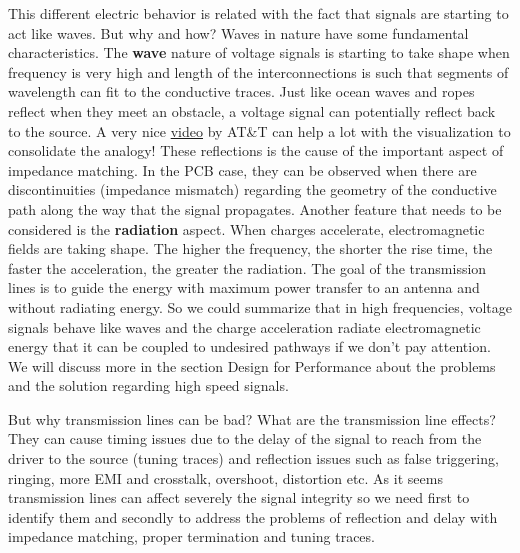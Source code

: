 \documentclass[final]{cubedoc}
\begin{document}
	
	
	This different electric behavior is related with the fact that signals are starting to act like waves. But why and how?
	Waves in nature have some fundamental characteristics. The \textbf{wave} nature of voltage signals is starting to take shape when frequency is very high and length of the interconnections is such that segments of wavelength can fit to the conductive traces. Just like ocean waves and ropes reflect when they meet an obstacle, a voltage signal can potentially reflect back to the source. A very nice \href{https://www.youtube.com/watch?v=DovunOxlY1k}{video} by AT\&T can help a lot with the visualization to consolidate the analogy! These reflections is the cause of the important aspect of impedance matching. In the PCB case, they can be observed when there are discontinuities (impedance mismatch) regarding the geometry of the conductive path along the way that the signal propagates. Another feature that needs to be considered is the \textbf{radiation} aspect. When charges accelerate, electromagnetic fields are taking shape. The higher the frequency, the shorter the rise time, the faster the acceleration, the greater the radiation. The goal of the transmission lines is to guide the energy with maximum power transfer to an antenna and without radiating energy. So we could summarize that in high frequencies, voltage signals behave like waves and the charge acceleration radiate electromagnetic energy that it can be coupled to undesired pathways if we don't pay attention. We will discuss more in the section Design for Performance about the problems and the solution regarding high speed signals.
	
	But why transmission lines can be bad? What are the transmission line effects? They can cause timing issues due to the delay of the signal to reach from the driver to the source (tuning traces) and reflection issues such as false triggering, ringing, more EMI and crosstalk, overshoot, distortion etc. As it seems transmission lines can affect severely the signal integrity so we need first to identify them and secondly to address the problems of reflection and delay with impedance matching, proper termination and tuning traces.
	
\end{document}

